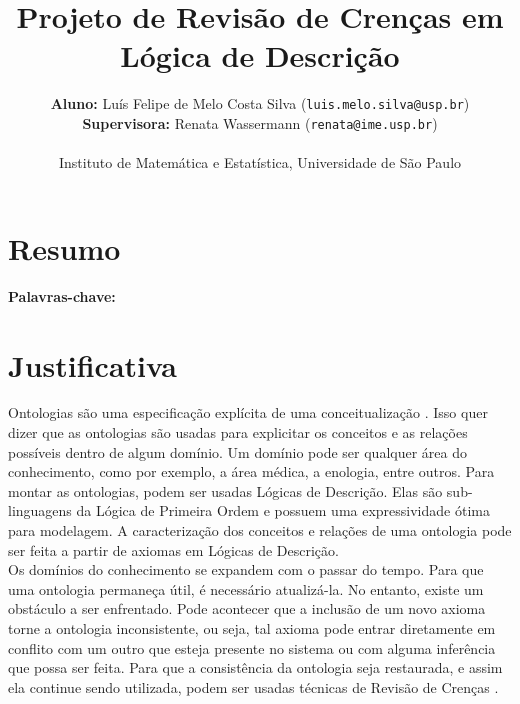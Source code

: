 \documentclass[12pt,letterpaper]{article}
\begin{document}
	
	\title{Projeto de Revisão de Crenças em Lógica de Descrição}
	\author{\textbf{Aluno:} Luís Felipe de Melo Costa Silva (\texttt{luis.melo.silva@usp.br})\\ 
		\textbf{Supervisora:} Renata Wassermann (\texttt{renata@ime.usp.br})\\ \\
		Instituto de Matemática e Estatística, Universidade de São Paulo}
	
	\maketitle
	
	\section{Resumo}
	
	\textbf{Palavras-chave:}
	
	\clearpage
	
	\section{Justificativa} 
	
	Ontologias são uma especificação explícita de uma conceitualização \cite{gruber1995toward}. Isso quer dizer que as ontologias são usadas para explicitar os conceitos e as relações possíveis dentro de algum domínio. Um domínio pode ser qualquer área do conhecimento, como por exemplo, a área médica, a enologia, entre outros. Para montar as ontologias, podem ser usadas Lógicas de Descrição. Elas são sub-linguagens da Lógica de Primeira Ordem e possuem uma expressividade ótima para modelagem. A caracterização dos conceitos e relações de uma ontologia pode ser feita a partir de axiomas em Lógicas de Descrição. \\
	
	Os domínios do conhecimento se expandem com o passar do tempo. Para que uma ontologia permaneça útil, é necessário atualizá-la. No entanto, existe um obstáculo a ser enfrentado. Pode acontecer que a inclusão de um novo axioma torne a ontologia inconsistente, ou seja, tal axioma pode entrar diretamente em conflito com um outro que esteja presente no sistema ou com alguma inferência que possa ser feita. Para que a consistência da ontologia seja restaurada, e assim ela continue sendo utilizada, podem ser usadas técnicas de Revisão de Crenças\cite{gardenfors2003belief} \cite{gardenfors1992belief}. \\
	
\end{document}

